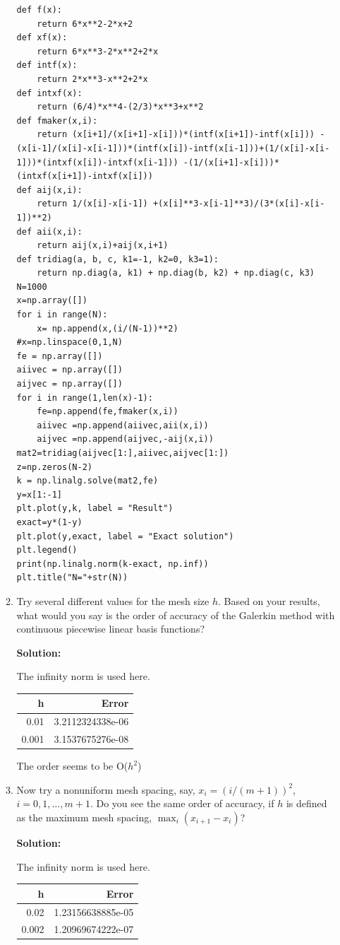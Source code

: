 \documentclass[letterpaper,12pt]{article}
\begin{document}
\begin{enumerate}
\begin{enumerate}
\begin{lstlisting}[style=myPythonstyle]
def f(x):
    return 6*x**2-2*x+2  
def xf(x):
    return 6*x**3-2*x**2+2*x  
def intf(x):
    return 2*x**3-x**2+2*x  
def intxf(x):
    return (6/4)*x**4-(2/3)*x**3+x**2  
def fmaker(x,i):
    return (x[i+1]/(x[i+1]-x[i]))*(intf(x[i+1])-intf(x[i])) - (x[i-1]/(x[i]-x[i-1]))*(intf(x[i])-intf(x[i-1]))+(1/(x[i]-x[i-1]))*(intxf(x[i])-intxf(x[i-1])) -(1/(x[i+1]-x[i]))*(intxf(x[i+1])-intxf(x[i])) 
def aij(x,i):
    return 1/(x[i]-x[i-1]) +(x[i]**3-x[i-1]**3)/(3*(x[i]-x[i-1])**2)
def aii(x,i):
    return aij(x,i)+aij(x,i+1)
def tridiag(a, b, c, k1=-1, k2=0, k3=1):
    return np.diag(a, k1) + np.diag(b, k2) + np.diag(c, k3)
N=1000
x=np.array([])
for i in range(N):
    x= np.append(x,(i/(N-1))**2)
#x=np.linspace(0,1,N)
fe = np.array([])
aiivec = np.array([])
aijvec = np.array([])
for i in range(1,len(x)-1):
    fe=np.append(fe,fmaker(x,i))  
    aiivec =np.append(aiivec,aii(x,i))
    aijvec =np.append(aijvec,-aij(x,i))
mat2=tridiag(aijvec[1:],aiivec,aijvec[1:])
z=np.zeros(N-2)
k = np.linalg.solve(mat2,fe)
y=x[1:-1]
plt.plot(y,k, label = "Result")
exact=y*(1-y)
plt.plot(y,exact, label = "Exact solution")
plt.legend()
print(np.linalg.norm(k-exact, np.inf))
plt.title("N="+str(N))

\end{lstlisting}
\item
Try several different values for the mesh size $h$.  Based on your results,
what would you say is the order of accuracy of the Galerkin method with
continuous piecewise linear basis functions?

{\bf Solution:}

The infinity norm is used here.

\begin{tabular}{rr}
\hline
    h &      Error \\
\hline
 0.01  & 3.2112324338e-06\\
 0.001 & 3.1537675276e-08 \\
\hline
\end{tabular}

The order seems to be O($h^2$)
\item
Now try a nonuniform mesh spacing, say, $x_i = (i/(m+1) )^2$, $i=0,1, \ldots ,
m+1$.  Do you see the same order of accuracy, if $h$ is defined as
the maximum mesh spacing, $\max_i ( x_{i+1} - x_i )$?

{\bf Solution:}

The infinity norm is used here.

\begin{tabular}{rr}
\hline
    h &      Error \\
\hline
 0.02  & 1.23156638885e-05\\
 0.002 & 1.20969674222e-07 \\
\hline
\end{tabular} 


\end{enumerate}
\end{enumerate}
\end{document}
